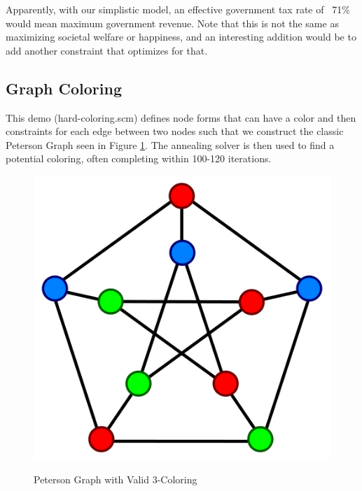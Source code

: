 \documentclass[12pt,a4paper]{article}
\begin{document}
Apparently, with our simplistic model, an effective government tax rate of ~71\% would mean maximum government revenue.  Note that this is not the same as maximizing societal welfare or happiness, and an interesting addition would be to add another constraint that optimizes for that.

\subsection{Graph Coloring}

This demo (hard-coloring.scm) defines node forms that can have a color and then constraints for each edge between two nodes such that we construct the classic Peterson Graph seen in Figure \ref{fig:Peterson}.  The annealing solver is then used to find a potential coloring, often completing within 100-120 iterations.
\begin{figure}[H]
\caption{Peterson Graph with Valid 3-Coloring}
\centering
\includegraphics[scale=.5]{peterson.png}
\label{fig:Peterson}
\end{figure}
\end{document}
